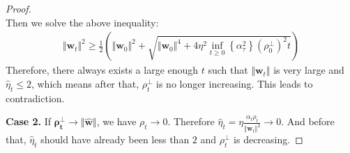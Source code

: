 \documentclass[pdflatex,sn-basic]{sn-jnl}%
\theoremstyle{thmstyleone}%
\begin{document}
\begin{appendices}
\begin{proof}
\begin{equation*}
    \end{equation*}
    Then we solve the above inequality:
    \begin{equation*}
    \begin{aligned}
      \Vert \mathbf{w}_t \Vert^{2} \ge 
      \frac{1}{2} \left(
        \Vert \mathbf{w}_{0} \Vert^2 + \sqrt{
          \Vert \mathbf{w}_{0} \Vert^4 + 4 \eta^{2} \inf_{t \ge 0} \left\{\alpha_{\tau}^2\right\}
          \left(\rho_{0}^{\perp}\right)^2  t
        }
      \right)
    \end{aligned}
    \end{equation*}
    Therefore, there always exists a large enough $t$ such that $\Vert \mathbf{w}_t \Vert$ is very large and $\hat{\eta}_t \le 2$, which means 
    after that, $\rho_t^{\perp}$ is no longer increasing. This leads to contradiction. 

    \noindent \textbf{Case 2.} 
    If $\boldsymbol{\rho_t^{\perp} \rightarrow \Vert \hat{\mathbf{w}} \Vert}$, we have $\rho_t \rightarrow 0$. 
    Therefore $\hat{\eta}_t = \eta \frac{\alpha_t \rho_t}{\Vert \mathbf{w}_t \Vert^2} \rightarrow 0$. 
    And before that, $\hat{\eta}_t$ should have already been less than $2$ and $\rho_t^{\perp}$ is decreasing. 
\end{proof}



\end{appendices}
\end{document}
